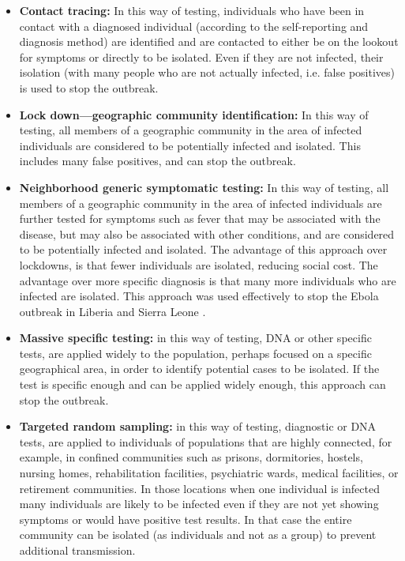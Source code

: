 \documentclass[onecolumn,journal]{IEEEtran}
\begin{document}
\begin{multicols}{2}
\begin{itemize}
\item \textbf{Contact tracing:} In this way of testing, individuals who have been in contact with a diagnosed individual (according to the self-reporting and diagnosis method) are identified and are contacted to either be on the lookout for symptoms or directly to be isolated. Even if they are not infected, their isolation (with many people who are not actually infected, i.e. false positives) is used to stop the outbreak.  

\item \textbf{Lock down---geographic community identification:} In this way of testing, all members of a geographic community in the area of infected individuals are considered to be potentially infected and isolated. This includes many false positives, and can stop the outbreak. 

\item \textbf{Neighborhood generic symptomatic testing:} In this way of testing, all members of a geographic community in the area of infected individuals are further tested for symptoms such as fever that may be associated with the disease, but may also be associated with other conditions, and are considered to be potentially infected and isolated. The advantage of this approach over lockdowns, is that fewer individuals are isolated, reducing social cost. The advantage over more specific diagnosis is that many more individuals who are infected are isolated. This approach was used effectively to stop the Ebola outbreak in Liberia and Sierra Leone \cite{ebola}.

\item \textbf{Massive specific testing:} in this way of testing, DNA or other specific tests, are applied widely to the population, perhaps focused on a specific geographical area, in order to identify potential cases to be isolated. If the test is specific enough and can be applied widely enough, this approach can stop the outbreak. 

\item \textbf{Targeted random sampling:} in this way of testing, diagnostic or DNA tests, are applied to individuals of populations that are highly connected, for example, in confined communities such as prisons, dormitories, hostels, nursing homes, rehabilitation facilities, psychiatric wards, medical facilities, or retirement communities. In those locations when one individual is infected many individuals are likely to be infected even if they are not yet showing symptoms or would have positive test results. In that case the entire community can be isolated (as individuals and not as a group) to prevent additional transmission. 


\end{itemize}
\end{multicols}
\end{document}
